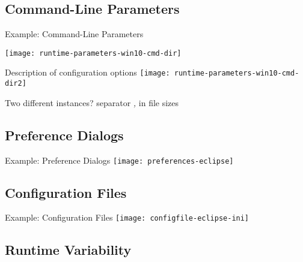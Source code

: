 \subsection{Command-Line Parameters}

\begin{frame}{Example: Command-Line Parameters}
	\begin{mycolumns}[t]
		\centering\texttt{[image: runtime-parameters-win10-cmd-dir]}

		Description of configuration options
	\mynextcolumn
		\centering\texttt{[image: runtime-parameters-win10-cmd-dir2]}

		Two different instances? \pause\pause separator \emph{,} in file sizes
	\end{mycolumns}
\end{frame}

\subsection{Preference Dialogs}

\begin{frame}{Example: Preference Dialogs}
	\centering\texttt{[image: preferences-eclipse]}
\end{frame}

\subsection{Configuration Files}

\begin{frame}{Example: Configuration Files}
	\centering\texttt{[image: configfile-eclipse-ini]} %
\end{frame}

\subsection{Runtime Variability}

